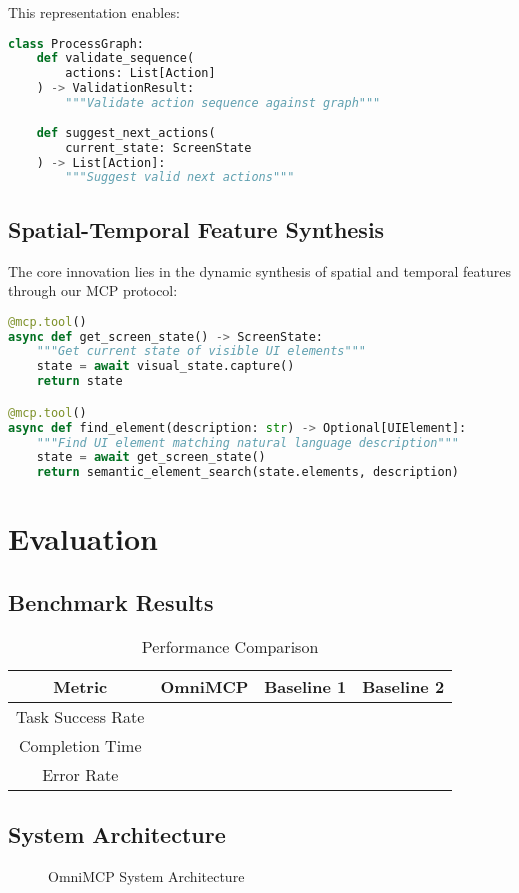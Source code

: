 \documentclass{article}
\begin{document}
This representation enables:
\begin{lstlisting}[language=Python]
class ProcessGraph:
    def validate_sequence(
        actions: List[Action]
    ) -> ValidationResult:
        """Validate action sequence against graph"""
    
    def suggest_next_actions(
        current_state: ScreenState
    ) -> List[Action]:
        """Suggest valid next actions"""
\end{lstlisting}

\subsection{Spatial-Temporal Feature Synthesis}
The core innovation lies in the dynamic synthesis of spatial and temporal features through our MCP protocol:

\begin{lstlisting}[language=Python]
@mcp.tool()
async def get_screen_state() -> ScreenState:
    """Get current state of visible UI elements"""
    state = await visual_state.capture()
    return state

@mcp.tool()
async def find_element(description: str) -> Optional[UIElement]:
    """Find UI element matching natural language description"""
    state = await get_screen_state()
    return semantic_element_search(state.elements, description)
\end{lstlisting}

\section{Evaluation}
\subsection{Benchmark Results}
\begin{table}[h]
\caption{Performance Comparison}
\begin{tabular}{|c|c|c|c|}
\hline
Metric & OmniMCP & Baseline 1 & Baseline 2 \\
\hline
Task Success Rate & & & \\
Completion Time & & & \\
Error Rate & & & \\
\hline
\end{tabular}
\end{table}

\subsection{System Architecture}
\begin{figure}[h]
\centering
\caption{OmniMCP System Architecture}
\label{fig:architecture}
\end{figure}
\end{document}
